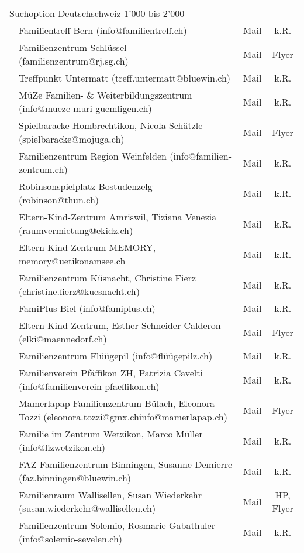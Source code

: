 \begin{longtable}[htbp]{|p{0.2em} p{20em} | c | c |}
  \multicolumn{2}{|l|}{Suchoption Deutschschweiz 1'000 bis 2'000} &  & \\
  & Familientreff Bern (info@familientreff.ch) & Mail & k.R.\\
  & Familienzentrum Schlüssel (familienzentrum@rj.sg.ch) & Mail & Flyer\\
  & Treffpunkt Untermatt (treff.untermatt@bluewin.ch) & Mail & k.R.\\
  & MüZe Familien- \& Weiterbildungszentrum (info@mueze-muri-guemligen.ch) & Mail & k.R.\\
  & Spielbaracke Hombrechtikon, Nicola Schätzle (spielbaracke@mojuga.ch) & Mail & Flyer\\
  & Familienzentrum Region Weinfelden (info@familien-zentrum.ch) & Mail & k.R.\\
  & Robinsonspielplatz Bostudenzelg (robinson@thun.ch) & Mail & k.R.\\
  & Eltern-Kind-Zentrum Amriswil, Tiziana Venezia (raumvermietung@ekidz.ch)  & Mail & k.R.\\
  & Eltern-Kind-Zentrum MEMORY, memory@uetikonamsee.ch & Mail & k.R.\\
  & Familienzentrum Küsnacht, Christine Fierz (christine.fierz@kuesnacht.ch) & Mail & k.R.\\
  & FamiPlus Biel (info@famiplus.ch) & Mail & k.R.\\
  & Eltern-Kind-Zentrum, Esther Schneider-Calderon (elki@maennedorf.ch) & Mail & Flyer\\
  & Familienzentrum Flüügepil (info@flüügepilz.ch) & Mail & k.R.\\
  & Familienverein Pfäffikon ZH, Patrizia Cavelti (info@familienverein-pfaeffikon.ch) & Mail & k.R.\\
  & Mamerlapap Familienzentrum Bülach, Eleonora Tozzi (eleonora.tozzi@gmx.chinfo@mamerlapap.ch) & Mail & Flyer\\
  & Familie im Zentrum Wetzikon, Marco Müller (info@fizwetzikon.ch) & Mail & k.R.\\
  & FAZ Familienzentrum Binningen, Susanne Demierre (faz.binningen@bluewin.ch) & Mail & k.R.\\
  & Familienraum Wallisellen, Susan Wiederkehr (susan.wiederkehr@wallisellen.ch) & Mail & HP, Flyer\\
  & Familienzentrum Solemio, Rosmarie Gabathuler (info@solemio-sevelen.ch) & Mail & k.R.\\
  
\end{longtable}

